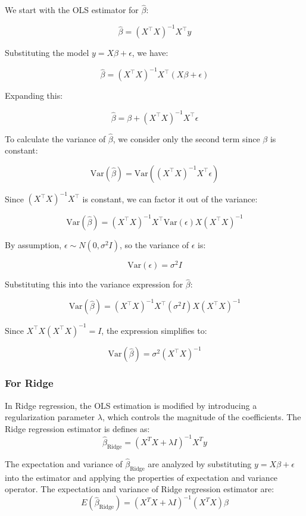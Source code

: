 \documentclass{article}
\begin{document}
We start with the OLS estimator for \(\hat{\beta}\):

\[
\hat{\beta} = (X^\top X)^{-1} X^\top y
\]

Substituting the model \( y = X\beta + \epsilon \), we have:

\[
\hat{\beta} = (X^\top X)^{-1} X^\top (X\beta + \epsilon)
\]

Expanding this:

\[
\hat{\beta} = \beta + (X^\top X)^{-1} X^\top \epsilon
\]

To calculate the variance of \(\hat{\beta}\), we consider only the second term since \(\beta\) is constant:

\[
\text{Var}(\hat{\beta}) = \text{Var}\left( (X^\top X)^{-1} X^\top \epsilon \right)
\]

Since \((X^\top X)^{-1} X^\top\) is constant, we can factor it out of the variance:

\[
\text{Var}(\hat{\beta}) = (X^\top X)^{-1} X^\top \text{Var}(\epsilon) X (X^\top X)^{-1}
\]

By assumption, \(\epsilon \sim N(0, \sigma^2 I)\), so the variance of \(\epsilon\) is:

\[
\text{Var}(\epsilon) = \sigma^2 I
\]

Substituting this into the variance expression for \(\hat{\beta}\):

\[
\text{Var}(\hat{\beta}) = (X^\top X)^{-1} X^\top (\sigma^2 I) X (X^\top X)^{-1}
\]

Since \( X^\top X (X^\top X)^{-1} = I \), the expression simplifies to:

\[
\text{Var}(\hat{\beta}) = \sigma^2 (X^\top X)^{-1}
\]
\newline



\subsubsection{For Ridge}
In Ridge regression, the OLS estimation is modified by introducing a regularization parameter \( \lambda \), which controls the magnitude of the coefficients. The Ridge regression estimator is defines as: 
\[
\hat{\beta}_{\text{Ridge}} = (X^TX + \lambda I)^{-1}X^Ty
\]

The expectation and variance of \( \hat{\beta}_{\text{Ridge}} \) are analyzed by substituting \( y = X\beta + \epsilon \) into the estimator and applying the properties of expectation and variance operator. The expectation and variance of Ridge regression estimator are: 
\[
E(\hat{\beta}_{\text{Ridge}}) = (X^TX + \lambda I)^{-1}(X^TX)\beta
\]
\end{document}

